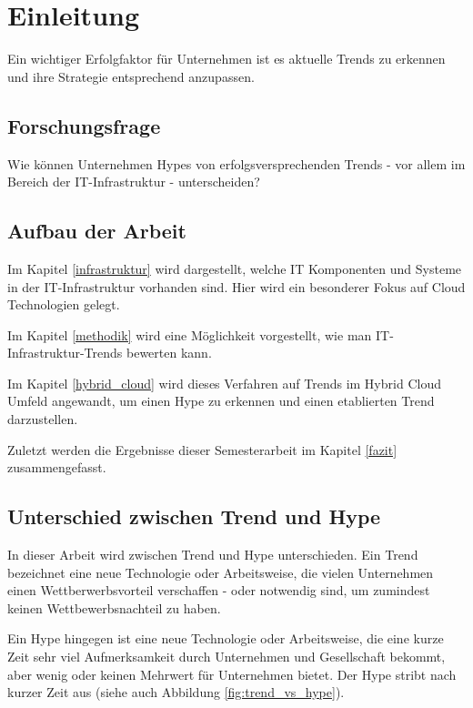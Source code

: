 \newpage
\section{Einleitung} \label{Einleitung}
Ein wichtiger Erfolgfaktor für Unternehmen ist es aktuelle Trends zu erkennen
und ihre Strategie entsprechend anzupassen. 


\subsection{Forschungsfrage}
Wie können Unternehmen Hypes von erfolgsversprechenden Trends - vor allem im
Bereich der IT-Infrastruktur - unterscheiden?

\subsection{Aufbau der Arbeit}

Im Kapitel \ref{infrastruktur} wird dargestellt, welche IT Komponenten und
Systeme in der IT-Infrastruktur vorhanden sind. Hier wird ein besonderer Fokus
auf Cloud Technologien gelegt.

Im Kapitel \ref{methodik} wird eine Möglichkeit vorgestellt, wie man
IT-Infrastruktur-Trends bewerten kann.

Im Kapitel \ref{hybrid_cloud} wird dieses Verfahren auf Trends im Hybrid
Cloud Umfeld angewandt, um einen Hype zu erkennen und einen etablierten Trend
darzustellen.

Zuletzt werden die Ergebnisse dieser Semesterarbeit im Kapitel \ref{fazit}
zusammengefasst.

\subsection{Unterschied zwischen Trend und Hype}

In dieser Arbeit wird zwischen Trend und Hype unterschieden. Ein Trend
bezeichnet eine neue Technologie oder Arbeitsweise, die vielen Unternehmen einen
Wettberwerbsvorteil verschaffen - oder notwendig sind, um zumindest keinen
Wettbewerbsnachteil zu haben.

Ein Hype hingegen ist eine neue Technologie oder Arbeitsweise, die eine kurze
Zeit sehr viel Aufmerksamkeit durch Unternehmen und Gesellschaft bekommt, aber
wenig oder keinen Mehrwert für Unternehmen bietet. Der Hype stribt nach kurzer
Zeit aus (siehe auch Abbildung \ref{fig:trend_vs_hype}).

